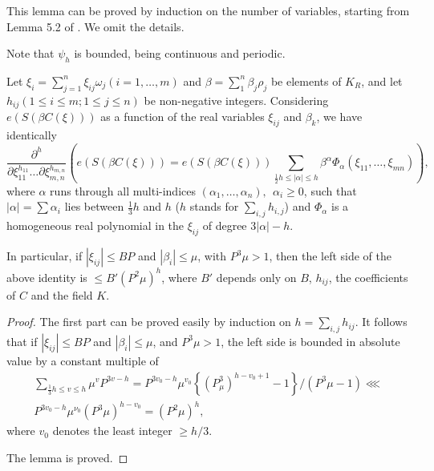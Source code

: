 This lemma can be proved by induction on the number of variables, starting from Lemma 5.2 of \cite{key3}. We omit the details.

Note that $\psi_h$ is bounded, being continuous and periodic.

\begin{lemma}%
Let $\xi_i = \sum\limits^n_{j=1} \xi_{ij} \omega_j (i =1,\ldots, m)$ and $\beta = \sum\limits^n_1 \beta_j \rho_j$ be elements of $K_R$, and let\pageoriginale $h_{ij} (1\leq i \leq m; 1 \leq j \leq n)$ be non-negative integers. Considering $e(S(\beta C(\xi)))$ as a function of the real variables $\xi_{ij}$ and $\beta_k$, we have identically
{\fontsize{10pt}{12pt}\selectfont
$$
\dfrac{\partial^h}{\partial \xi^{h_{11}}_{11} \ldots \partial \xi^{h_{m,n}}_{m,n}} (e(S(\beta C (\xi)))
= e (S (\beta C (\xi))) \sum\limits_{\frac{1}{2} h \leq |\alpha| \leq h} \beta^\alpha \Phi_\alpha (\xi_{11}, \ldots, \xi_{mn})),
$$}\relax
where $\alpha$ runs through all multi-indices $(\alpha_1, \ldots, \alpha_n), ~~\alpha_i \geq 0$, such that $|\alpha| = \sum \alpha_i$ lies between $\frac{1}{3}h$ and $h$ ($h$ stands for $\sum\limits_{i,j} h_{i,j}$) and $\Phi_{\alpha}$ is a homogeneous real polynomial in the $\xi_{ij}$ of degree $3 |\alpha| -h$.

In particular, if $|\xi_{ij}| \leq BP$ and $|\beta_i| \leq \mu$, with $P^3\mu >1$, then the left side of the above identity is $\leq B' (P^2\mu)^h$, where $B'$ depends only on $B$, $h_{ij}$, the coefficients of $C$ and the field $K$.
\end{lemma}

\begin{proof}
The first part can be proved easily by induction on $h=\sum\limits_{i,j} h_{ij}$. It follows that if $|\xi_{ij}| \leq BP$ and $|\beta_i| \leq \mu$, and $P^3 \mu >1$, the left side is bounded in absolute value by a constant multiple of 
\begin{multline*}
\sum\limits_{\frac{1}{3} h \leq v \leq h} \mu^v P^{3v-h} = P^{3 v_0-h} \mu^{v_0} \left\{(P^3_\mu)^{h-v_0+1}-1 \right\} / (P^3 \mu -1) \lll\\
 P^{3v_0-h} \mu^{\nu_0} (P^3\mu)^{h-v_0} = (P^2 \mu)^h,
\end{multline*}
where $v_0$ denotes the least integer $\geq h/3$.       

The lemma is proved.
\end{proof}

